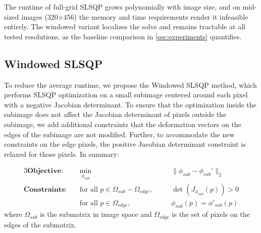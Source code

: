 \documentclass[lettersize,journal]{IEEEtran}
\begin{document}
The runtime of full-grid SLSQP grows polynomially with image size, and on mid-sized images (320$\times$456) the memory and time requirements render it infeasible entirely. The windowed variant localizes the solve and remains tractable at all tested resolutions, as the baseline comparison in \autoref{sec:experiments} quantifies.

\subsection{Windowed SLSQP}
\label{sec:windowed_slsqp}

To reduce the average runtime, we propose the Windowed SLSQP method, which performs SLSQP optimization on a small subimage centered around each pixel with a negative Jacobian determinant. To ensure that the optimization inside the subimage does not affect the Jacobian determinant of pixels outside the subimage, we add additional constraints that the deformation vectors on the edges of the subimage are not modified. Further, to accommodate the new constraints on the edge pixels, the positive Jacobian determinant constraint is relaxed for those pixels. In summary:

\begin{alignat}{3}
\textbf{Objective:} \quad & \min_{\phi_{sub}} && \quad \|\phi_{sub} - \phi_{sub}'\|_2 \label{eq:iter_objective_function} \\
\textbf{Constraints:} \quad & \text{for all } p \in \Omega_{sub}-\Omega_{edge}, && \quad \det(J_{\phi_{sub}}(p)) > 0 \\
\quad & \text{for all } p \in \Omega_{edge}, && \quad \phi_{sub}(p) = \phi'_{sub}(p)
\label{eq:iter_opt_constraint}
\end{alignat}
where $\Omega_{sub}$ is the submatrix in image space and $\Omega_{edge}$ is the set of pixels on the edges of the submatrix.
\end{document}
